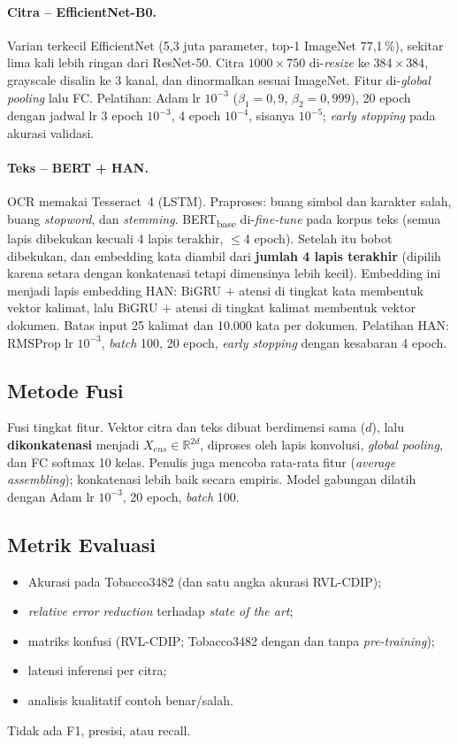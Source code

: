 \paragraph{Citra -- EfficientNet-B0.} Varian terkecil EfficientNet (5,3 juta parameter,
top-1 ImageNet 77,1\,\%), sekitar lima kali lebih ringan dari ResNet-50. Citra
$1000\times750$ di-\emph{resize} ke $384\times384$, grayscale disalin ke 3 kanal, dan
dinormalkan sesuai ImageNet. Fitur di-\emph{global pooling} lalu FC. Pelatihan: Adam
lr $10^{-3}$ ($\beta_1=0{,}9$, $\beta_2=0{,}999$), 20 epoch dengan jadwal lr 3 epoch
$10^{-3}$, 4 epoch $10^{-4}$, sisanya $10^{-5}$; \emph{early stopping} pada akurasi
validasi.

\paragraph{Teks -- BERT + HAN.} OCR memakai Tesseract~4 (LSTM). Praproses: buang simbol
dan karakter salah, buang \emph{stopword}, dan \emph{stemming}. BERT\textsubscript{base}
di-\emph{fine-tune} pada korpus teks (semua lapis dibekukan kecuali 4 lapis terakhir,
$\leq$4 epoch). Setelah itu bobot dibekukan, dan embedding kata diambil dari
\textbf{jumlah 4 lapis terakhir} (dipilih karena setara dengan konkatenasi tetapi
dimensinya lebih kecil). Embedding ini menjadi lapis embedding HAN: BiGRU + atensi di
tingkat kata membentuk vektor kalimat, lalu BiGRU + atensi di tingkat kalimat membentuk
vektor dokumen. Batas input 25 kalimat dan 10.000 kata per dokumen. Pelatihan HAN: RMSProp
lr $10^{-3}$, \emph{batch} 100, 20 epoch, \emph{early stopping} dengan kesabaran 4 epoch.

\subsection{Metode Fusi}
Fusi tingkat fitur. Vektor citra dan teks dibuat berdimensi sama ($d$), lalu
\textbf{dikonkatenasi} menjadi $X_{ens}\in\mathbb{R}^{2d}$, diproses oleh lapis konvolusi,
\emph{global pooling}, dan FC softmax 10 kelas. Penulis juga mencoba rata-rata fitur
(\emph{average assembling}); konkatenasi lebih baik secara empiris. Model gabungan
dilatih dengan Adam lr $10^{-3}$, 20 epoch, \emph{batch} 100.

\subsection{Metrik Evaluasi}
\begin{itemize}
  \item Akurasi pada Tobacco3482 (dan satu angka akurasi RVL-CDIP);
  \item \emph{relative error reduction} terhadap \emph{state of the art};
  \item matriks konfusi (RVL-CDIP; Tobacco3482 dengan dan tanpa \emph{pre-training});
  \item latensi inferensi per citra;
  \item analisis kualitatif contoh benar/salah.
\end{itemize}
Tidak ada F1, presisi, atau recall.

